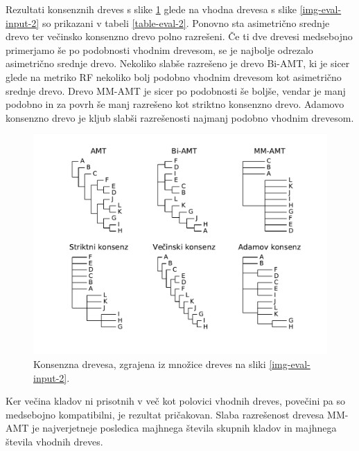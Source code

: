 \documentclass[a4paper, 12pt]{book}
\begin{document}
\noindent Rezultati konsenznih dreves s slike \ref{img-eval-result-2} glede na vhodna 
drevesa s slike \ref{img-eval-input-2} so prikazani v tabeli \ref{table-eval-2}. 
Ponovno sta asimetrično srednje drevo ter večinsko konsenzno drevo polno 
razrešeni. Če ti dve drevesi medsebojno primerjamo še po podobnosti vhodnim 
drevesom, se je najbolje odrezalo asimetrično srednje drevo. Nekoliko slabše 
razrešeno je drevo Bi-AMT, ki je sicer glede na metriko RF nekoliko bolj 
podobno vhodnim drevesom kot asimetrično srednje drevo. Drevo MM-AMT je sicer
po podobnosti še boljše, vendar je manj podobno in za povrh še manj razrešeno
kot striktno konsenzno drevo. Adamovo konsenzno drevo je kljub slabši razrešenosti
najmanj podobno vhodnim drevesom.

\begin{figure}[h!]
	\begin{center}
		\includegraphics[scale=0.64, clip=true, trim=1.5cm 1.5cm 1cm 0.8cm]{gfx/eval_gfx_2.pdf}
	\end{center}
	\caption{Konsenzna drevesa, zgrajena iz množice dreves na sliki \ref{img-eval-input-2}.}
	\label{img-eval-result-2}
\end{figure}

Ker večina kladov ni prisotnih v več kot polovici vhodnih dreves, povečini pa so 
medsebojno kompatibilni, je rezultat pričakovan. Slaba razrešenost drevesa MM-AMT 
je najverjetneje posledica majhnega števila skupnih kladov in majhnega števila
vhodnih dreves. 
\end{document}
